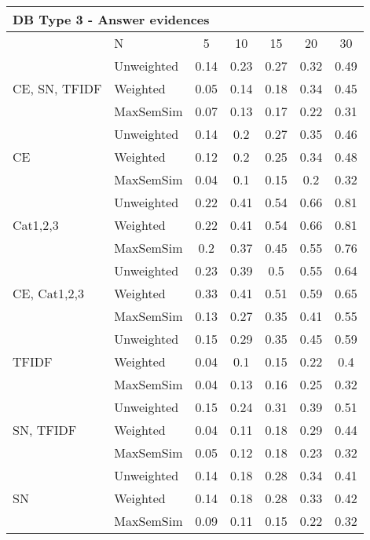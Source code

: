 \documentclass[conference]{IEEEtran}
\begin{document}
\begin{table*}[!h]
\begin{tabular}{l||l|ccccc}
		\multicolumn{7}{l}{DB Type 3 - Answer evidences}\\\hline\hline
		& N & 5 & 10 & 15 & 20 & 30\\\hline
		\hline
		
		\multirow{3}{*}{CE, SN, TFIDF} & Unweighted & 0.14 & 0.23 & 0.27 & 0.32 & 0.49\\
		 & Weighted & 0.05 & 0.14 & 0.18 & 0.34 & 0.45\\
		 & MaxSemSim & 0.07 & 0.13 & 0.17 & 0.22 & 0.31\\ 
		\hline
		
		\multirow{3}{*}{CE} & Unweighted & 0.14 & 0.2 & 0.27 & 0.35 & 0.46\\
		 & Weighted & 0.12 & 0.2 & 0.25 & 0.34 & 0.48\\
		 & MaxSemSim & 0.04 & 0.1 & 0.15 & 0.2 & 0.32\\ 
		\hline
		
		\multirow{3}{*}{Cat1,2,3} & Unweighted & 0.22 & 0.41 & 0.54 & 0.66 & 0.81\\
		 & Weighted & 0.22 & 0.41 & 0.54 & 0.66 & 0.81\\
		 & MaxSemSim & 0.2 & 0.37 & 0.45 & 0.55 & 0.76\\ 
		\hline
		
		\multirow{3}{*}{CE, Cat1,2,3} & Unweighted & 0.23 & 0.39 & 0.5 & 0.55 & 0.64\\
		 & Weighted & 0.33 & 0.41 & 0.51 & 0.59 & 0.65\\
		 & MaxSemSim & 0.13 & 0.27 & 0.35 & 0.41 & 0.55\\ 
		\hline
		
		\multirow{3}{*}{TFIDF} & Unweighted & 0.15 & 0.29 & 0.35 & 0.45 & 0.59\\
		 & Weighted & 0.04 & 0.1 & 0.15 & 0.22 & 0.4\\
		 & MaxSemSim & 0.04 & 0.13 & 0.16 & 0.25 & 0.32\\ 
		\hline
		
		\multirow{3}{*}{SN, TFIDF} & Unweighted & 0.15 & 0.24 & 0.31 & 0.39 & 0.51\\
		 & Weighted & 0.04 & 0.11 & 0.18 & 0.29 & 0.44\\
		 & MaxSemSim & 0.05 & 0.12 & 0.18 & 0.23 & 0.32\\ 
		\hline
		
		\multirow{3}{*}{SN} & Unweighted & 0.14 & 0.18 & 0.28 & 0.34 & 0.41\\
		 & Weighted & 0.14 & 0.18 & 0.28 & 0.33 & 0.42\\
		 & MaxSemSim & 0.09 & 0.11 & 0.15 & 0.22 & 0.32\\ 
		\hline		
		

\end{tabular}
\end{table*}
\end{document}
